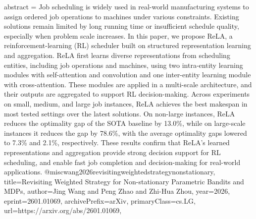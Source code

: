 {      abstract = {Job scheduling is widely used in real-world manufacturing systems to assign ordered job operations to machines under various constraints. Existing solutions remain limited by long running time or insufficient schedule quality, especially when problem scale increases. In this paper, we propose ReLA, a reinforcement-learning (RL) scheduler built on structured representation learning and aggregation. ReLA first learns diverse representations from scheduling entities, including job operations and machines, using two intra-entity learning modules with self-attention and convolution and one inter-entity learning module with cross-attention. These modules are applied in a multi-scale architecture, and their outputs are aggregated to support RL decision-making. Across experiments on small, medium, and large job instances, ReLA achieves the best makespan in most tested settings over the latest solutions. On non-large instances, ReLA reduces the optimality gap of the SOTA baseline by 13.0\%, while on large-scale instances it reduces the gap by 78.6\%, with the average optimality gaps lowered to 7.3\% and 2.1\%, respectively. These results confirm that ReLA's learned representations and aggregation provide strong decision support for RL scheduling, and enable fast job completion and decision-making for real-world applications.}
}@misc{wang2026revisitingweightedstrategynonstationary,
      title={Revisiting Weighted Strategy for Non-stationary Parametric Bandits and MDPs}, 
      author={Jing Wang and Peng Zhao and Zhi-Hua Zhou},
      year={2026},
      eprint={2601.01069},
      archivePrefix={arXiv},
      primaryClass={cs.LG},
      url={https://arxiv.org/abs/2601.01069},
}

